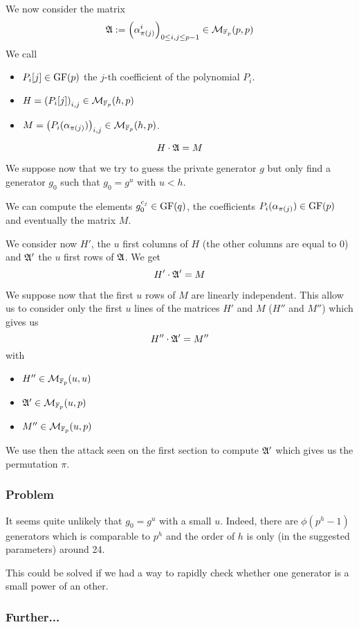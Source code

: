 \documentclass[12pt,a4paper,titlepage]{article}
\begin{document}
We now consider the matrix
$$ \frak{A} := \left( \alpha_{\pi(j)}^i \right)_{0 \leq i,j \leq p-1} \in \mathcal{M}_{\mathbb{F}_p}(p,p)$$
We call
\begin{itemize}
\item $P_i[j] \in \text{GF}(p)$ the $j$-th coefficient of the polynomial $P_i$.
\item $H = \left( P_i[j] \right)_{i,j} \in \mathcal{M}_{\mathbb{F}_p}(h,p)$
\item $M = \left( P_i(\alpha_{\pi(j)}) \right)_{i,j} \in \mathcal{M}_{\mathbb{F}_p}(h,p)$.
\end{itemize}

$$ H \cdot \frak{A} = M $$

We suppose now that we try to guess the private generator $g$ but only find a generator $g_0$ such that $g_0 = g^u$ with $u < h$.

We can compute the elements $g_0^{c_j} \in \text{GF}(q)$, the coefficients $P_i(\alpha_{\pi(j)}) \in \text{GF}(p)$ and eventually the matrix $M$.

We consider now $H'$, the $u$ first columns of $H$ (the other columns are equal to 0) and $\frak{A}'$ the $u$ first rows of $\frak{A}$.
We get
$$ H' \cdot \frak{A}' = M $$

We suppose now that the first $u$ rows of $M$ are linearly independent. This allow us to consider only the first $u$ lines of the matrices $H'$ and $M$ ($H''$ and $M''$) which gives us
$$ H'' \cdot \frak{A}' = M'' $$
with
\begin{itemize}
\item $H'' \in \mathcal{M}_{\mathbb{F}_p}(u,u)$
\item $\frak{A}' \in \mathcal{M}_{\mathbb{F}_p}(u,p)$
\item $M'' \in \mathcal{M}_{\mathbb{F}_p}(u,p)$
\end{itemize}

We use then the attack seen on the first section to compute $\frak{A}'$ which gives us the permutation $\pi$.

\subsubsection{Problem}
It seems quite unlikely that $g_0 = g^u$ with a small $u$.
Indeed, there are $\phi(p^h-1)$ generators which is comparable to $p^h$ and the order of $h$ is only (in the suggested parameters) around 24. 

This could be solved if we had a way to rapidly check whether one generator is a small power of an other.

\subsubsection{Further...}
\end{document}
